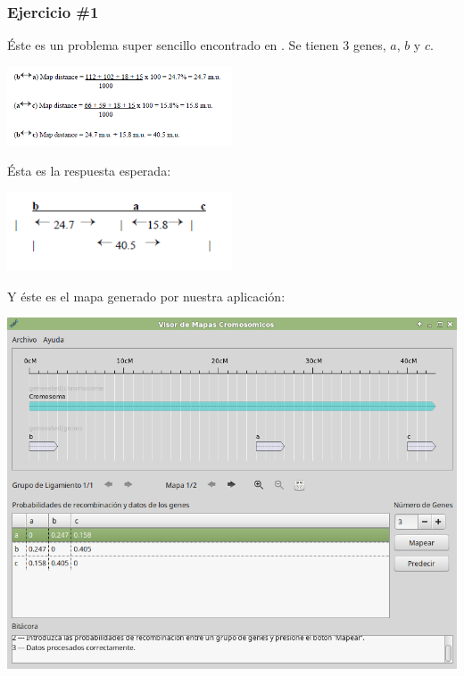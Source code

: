 \documentclass{article}
\begin{document}
	\subsubsection{Ejercicio \#1}
	
	Éste es un problema super sencillo encontrado en \cite{carrinnes2003handbook}. Se tienen 3 genes, $a$, $b$ y $c$.
	
	\begin{center}
		\includegraphics[width=0.5\textwidth]{images/e_1.png}
	\end{center}
	
	Ésta es la respuesta esperada:
	
	\begin{center}
		\includegraphics[width=0.5\textwidth]{images/e_2.png}
	\end{center}
	
	Y éste es el mapa generado por nuestra aplicación:
	
	\begin{center}
		\includegraphics[scale=0.5]{images/e_3.png}
	\end{center}
	
\end{document}
